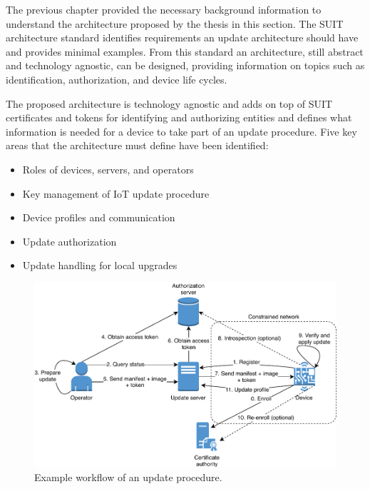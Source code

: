 \documentclass[0-thesis.tex]{subfiles}
\begin{document}
The previous chapter provided the necessary background information to understand the
architecture proposed by the thesis in this section. The SUIT architecture standard
identifies requirements an update architecture should have and provides minimal examples.
From this standard an architecture, still abstract and technology agnostic, can be
designed, providing information on topics such as identification, authorization, and
device life cycles. 

The proposed architecture is technology agnostic and adds on top of SUIT certificates and
tokens for identifying and authorizing entities and defines what information is needed
for a device to take part of an update procedure. Five key areas that the architecture
must define have been identified:

\begin{itemize}
    \item Roles of devices, servers, and operators
    \item Key management of IoT update procedure
    \item Device profiles and communication
    \item Update authorization
    \item Update handling for local upgrades
\end{itemize}

\begin{figure}[t]
    \caption{Example workflow of an update procedure.}
    \label{fig:communication-workflow}
    \includegraphics{images/update-flow.pdf}
\end{figure}
\end{document}
